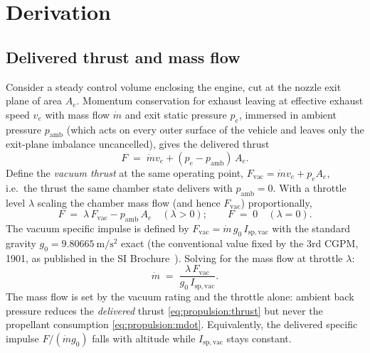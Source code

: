 \section{Derivation}
\label{sec:propulsion:derivation}

\subsection{Delivered thrust and mass flow}

Consider a steady control volume enclosing the engine, cut at the
nozzle exit plane of area $A_e$. Momentum conservation for exhaust
leaving at effective exhaust speed $v_e$ with mass flow $\dot{m}$ and
exit static pressure $p_e$, immersed in ambient pressure
$p_{\mathrm{amb}}$ (which acts on every outer surface of the vehicle
and leaves only the exit-plane imbalance uncancelled), gives the
delivered thrust
\begin{equation*}
  F \;=\; \dot{m} v_e + (p_e - p_{\mathrm{amb}})\, A_e.
\end{equation*}
Define the \emph{vacuum thrust} at the same operating point,
$F_{\mathrm{vac}} = \dot{m} v_e + p_e A_e$, i.e.\ the thrust the same
chamber state delivers with $p_{\mathrm{amb}} = 0$. With a throttle
level $\lambda$ scaling the chamber mass flow (and hence
$F_{\mathrm{vac}}$) proportionally,
\begin{equation}
  \boxed{\; F \;=\; \lambda\, F_{\mathrm{vac}}
    - p_{\mathrm{amb}}\, A_e \quad (\lambda > 0); \qquad
    F \;=\; 0 \quad (\lambda = 0). \;}
  \label{eq:propulsion:thrust}
\end{equation}
The vacuum specific impulse is defined by
$F_{\mathrm{vac}} = \dot{m}\, g_0\, I_{\mathrm{sp,vac}}$ with the
standard gravity $g_0 = \qty{9.80665}{\metre\per\second\squared}$ exact
(the conventional value fixed by the 3rd CGPM, 1901, as published in the
SI Brochure~\cite{bipm2019}). Solving for the mass flow at throttle
$\lambda$:
\begin{equation}
  \boxed{\; \dot{m} \;=\;
    \frac{\lambda\, F_{\mathrm{vac}}}{g_0\, I_{\mathrm{sp,vac}}}. \;}
  \label{eq:propulsion:mdot}
\end{equation}
The mass flow is set by the vacuum rating and the throttle alone:
ambient back pressure reduces the \emph{delivered} thrust
\eqref{eq:propulsion:thrust} but never the propellant consumption
\eqref{eq:propulsion:mdot}. Equivalently, the delivered specific
impulse $F / (\dot{m} g_0)$ falls with altitude while
$I_{\mathrm{sp,vac}}$ stays constant.

